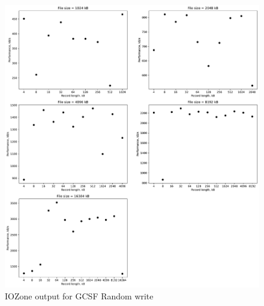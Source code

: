 \begin{figure}[!htb]
	\label{fig:app_bench_gcsf_rnd_write}
	\begin{center}
		\includegraphics[width=1.0\textwidth]{figures/benchmarking/gcsf/Random write.pdf}
	\end{center}
	\caption{IOZone output for GCSF Random write}
\end{figure}

